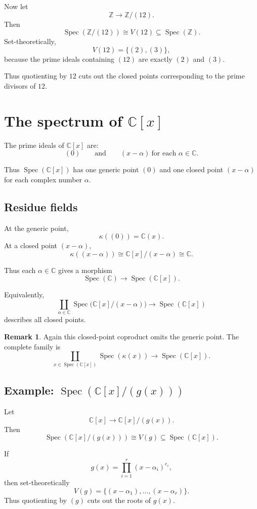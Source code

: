 \documentclass[11pt]{article}
\theoremstyle{definition}
\newtheorem{remark}[theorem]{Remark}
\newcommand{\Z}{\mathbb{Z}}
\newcommand{\C}{\mathbb{C}}
\newcommand{\Spec}{\operatorname{Spec}}
\newcommand{\kk}[1]{\kappa\!\left(#1\right)}
\begin{document}
	Now let
	\[
	\Z\to \Z/(12).
	\]
	Then
	\[
	\Spec(\Z/(12))\cong V(12)\subseteq \Spec(\Z).
	\]
	Set-theoretically,
	\[
	V(12)=\{(2),(3)\},
	\]
	because the prime ideals containing \((12)\) are exactly \((2)\) and \((3)\).
	
	Thus quotienting by \(12\) cuts out the closed points corresponding to the prime divisors of \(12\).
	
	\section{The spectrum of \(\C[x]\)}
	
	The prime ideals of \(\C[x]\) are:
	\[
	(0)
	\qquad\text{and}\qquad
	(x-\alpha)\ \text{for each }\alpha\in \C.
	\]
	
	Thus \(\Spec(\C[x])\) has one generic point \((0)\) and one closed point \((x-\alpha)\) for each complex number \(\alpha\).
	
	\subsection{Residue fields}
	
	At the generic point,
	\[
	\kk{(0)}=\C(x).
	\]
	At a closed point \((x-\alpha)\),
	\[
	\kk{(x-\alpha)}\cong \C[x]/(x-\alpha)\cong \C.
	\]
	
	Thus each \(\alpha\in\C\) gives a morphism
	\[
	\Spec(\C)\to \Spec(\C[x]).
	\]
	
	Equivalently,
	\[
	\coprod_{\alpha\in \C}\Spec\!\bigl(\C[x]/(x-\alpha)\bigr)\to \Spec(\C[x])
	\]
	describes all closed points.
	
	\begin{remark}
		Again this closed-point coproduct omits the generic point. The complete family is
		\[
		\coprod_{x\in \Spec(\C[x])}\Spec(\kk{x})\to \Spec(\C[x]).
		\]
	\end{remark}
	
	\subsection{Example: \(\Spec(\C[x]/(g(x)))\)}
	
	Let
	\[
	\C[x]\to \C[x]/(g(x)).
	\]
	Then
	\[
	\Spec(\C[x]/(g(x)))\cong V(g)\subseteq \Spec(\C[x]).
	\]
	
	If
	\[
	g(x)=\prod_{i=1}^r (x-\alpha_i)^{e_i},
	\]
	then set-theoretically
	\[
	V(g)=\{(x-\alpha_1),\dots,(x-\alpha_r)\}.
	\]
	Thus quotienting by \((g)\) cuts out the roots of \(g(x)\).
	
\end{document}

